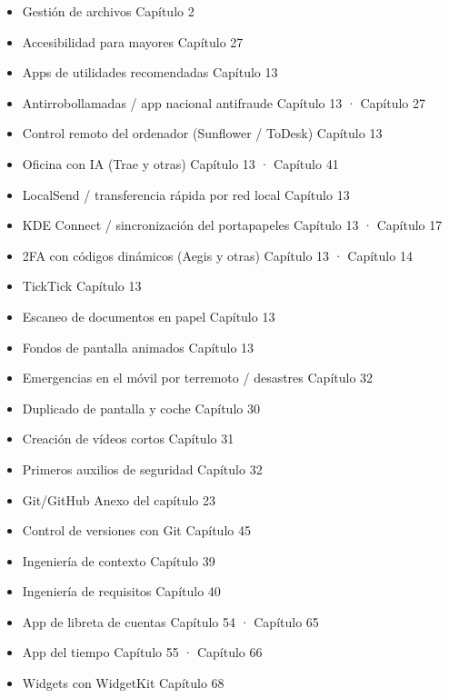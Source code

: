 \begin{itemize}
  \item Gestión de archivos Capítulo 2
  \item Accesibilidad para mayores Capítulo 27
  \item Apps de utilidades recomendadas Capítulo 13
  \item Antirrobollamadas / app nacional antifraude Capítulo 13 · Capítulo 27
  \item Control remoto del ordenador (Sunflower / ToDesk) Capítulo 13
  \item Oficina con IA (Trae y otras) Capítulo 13 · Capítulo 41
  \item LocalSend / transferencia rápida por red local Capítulo 13
  \item KDE Connect / sincronización del portapapeles Capítulo 13 · Capítulo 17
  \item 2FA con códigos dinámicos (Aegis y otras) Capítulo 13 · Capítulo 14
  \item TickTick Capítulo 13
  \item Escaneo de documentos en papel Capítulo 13
  \item Fondos de pantalla animados Capítulo 13
  \item Emergencias en el móvil por terremoto / desastres Capítulo 32
  \item Duplicado de pantalla y coche Capítulo 30
  \item Creación de vídeos cortos Capítulo 31
  \item Primeros auxilios de seguridad Capítulo 32
  \item Git/GitHub Anexo del capítulo 23
  \item Control de versiones con Git Capítulo 45
  \item Ingeniería de contexto Capítulo 39
  \item Ingeniería de requisitos Capítulo 40
  \item App de libreta de cuentas Capítulo 54 · Capítulo 65
  \item App del tiempo Capítulo 55 · Capítulo 66
  \item Widgets con WidgetKit Capítulo 68
\end{itemize}
